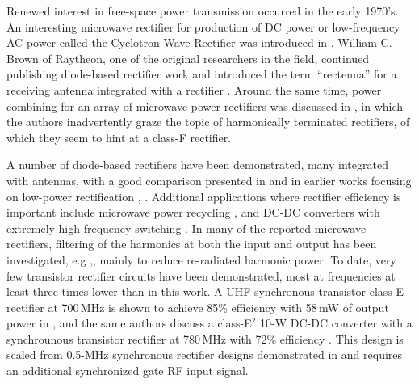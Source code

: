 Renewed interest in free-space power transmission occurred in the early 1970's. An interesting microwave rectifier for production of DC power or low-frequency AC power called the Cyclotron-Wave Rectifier was introduced in \cite{cyclotron_rect1,cyclotron_rect2}. William C. Brown of Raytheon, one of the original researchers in the field, continued publishing diode-based rectifier work and introduced the term ``rectenna'' for a receiving antenna integrated with a rectifier \cite{brown1_1970,brown3_1970,brown}.  Around the same time,  power combining for an array of microwave power rectifiers was discussed in \cite{rect_power_combine}, in which the authors inadvertently graze the topic of harmonically terminated rectifiers, of which they seem to hint at a class-F rectifier.
\begin{shaded}
A number of diode-based rectifiers have been demonstrated, many integrated with antennas, with a good comparison presented in \cite{erezMTT2012}  and in earlier works focusing on low-power rectification \cite{hagerty}, \cite{erez_thesis}. Additional applications where rectifier efficiency is important include microwave power recycling \cite{asbeck}, and DC-DC converters with extremely high frequency switching \cite{4500dcdc,JoseIMS-rect}. In many of the reported microwave rectifiers, filtering of the harmonics at both the input and output has been investigated, e.g \cite{rectifier_harmonic_generation},\cite{low_cost_rectenna}, mainly to reduce re-radiated harmonic power. To date, very few transistor rectifier circuits have been demonstrated, most at frequencies at least three times lower than in this work.  A UHF synchronous transistor class-E rectifier at 700\,MHz is shown to achieve 85\% efficiency with 58\,mW of output power in \cite{JoseIMS-rect}, and the same authors discuss a class-E$^2$ 10-W DC-DC converter with a synchrounous transistor rectifier at 780\,MHz with 72\% efficiency \cite{Jose-DC-DC-IMS}. This design is scaled from 0.5-MHz synchronous rectifier designs demonstrated in \cite{Kaz} and requires an additional synchronized gate RF input signal.
\end{shaded}
